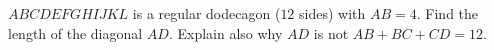 $ABCDEFGHIJKL$ is a regular dodecagon ($12$ sides) with $AB=4$. Find the length of the diagonal $AD$. Explain also why $AD$ is not $AB+BC+CD=12$.
